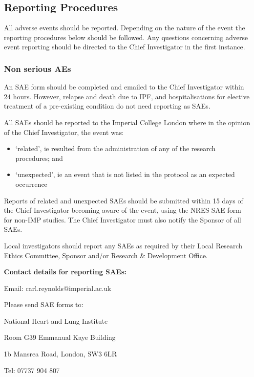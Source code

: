 \documentclass[a4paper,10pt]{article}
\begin{document}
\subsection{Reporting Procedures}
All adverse events should be reported. Depending on the nature of the event the reporting procedures below should be followed. Any questions concerning adverse event reporting should be directed to the Chief Investigator in the first instance.  

\subsubsection{Non serious AEs}
An SAE form should be completed and emailed to the Chief Investigator within 24 hours. However, relapse and death due to IPF, and hospitalisations for elective treatment of a pre-existing condition do not need reporting as SAEs.

All SAEs should be reported to the Imperial College London where in the opinion of the Chief Investigator, the event was: \begin{itemize}
                                                                                                                           \item ‘related’, ie resulted from the administration of any of the research procedures; and
					   \item ‘unexpected’, ie an event that is not listed in the protocol as an expected occurrence
                                                                                                                         \end{itemize}

                                                                                                                          
Reports of related and unexpected SAEs should be submitted within 15 days of the Chief Investigator becoming aware of the event, using the NRES SAE form for non-IMP studies. The Chief Investigator must also notify the Sponsor of all SAEs.

Local investigators should report any SAEs as required by their Local Research Ethics Committee, Sponsor and/or Research \& Development Office.

\begin{center}
\textbf{Contact details for reporting SAEs:}
 
Email: carl.reynolds@imperial.ac.uk

Please send SAE forms to: 

National Heart and Lung Institute

Room G39 Emmanual Kaye Building

1b Mansrea Road, London, SW3 6LR 

Tel: 07737 904 807

\end{center}
\end{document}

